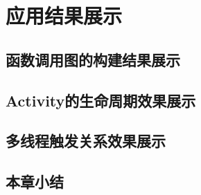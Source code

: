 \chapter{应用结果展示}  
\label{chp:display}


\section{函数调用图的构建结果展示}
\section{Activity的生命周期效果展示}
\section{多线程触发关系效果展示}

 \section{本章小结}
